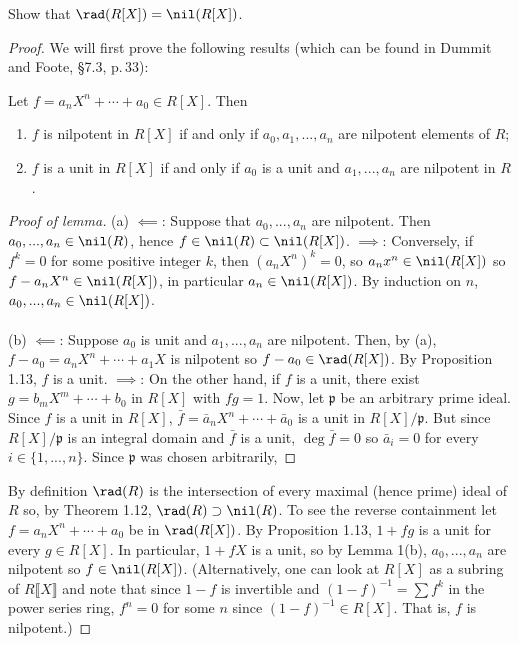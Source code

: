 \begin{problem}
Show that $\rad(R[X])=\nil(R[X])$.
\end{problem}
\begin{proof}
We will first prove the following results (which can be found in
Dummit and Foote, \S7.3, p.\,33):
\begin{lemma}
Let $f=a_nX^n+\cdots+a_0\in R[X]$. Then
\begin{enumerate}[noitemsep,label=(\alph*)]
\item $f$ is nilpotent in $R[X]$ if and only if $a_0,a_1,...,a_n$
  are nilpotent elements of $R$;
\item $f$ is a unit in $R[X]$ if and only if $a_0$ is a unit and
  $a_1,...,a_n$ are nilpotent in $R$.
\end{enumerate}
\end{lemma}
\begin{proof}[Proof of lemma]
\renewcommand\qedsymbol{$\vardiamondsuit$}
(a) $\impliedby$: Suppose that $a_0,...,a_n$ are nilpotent. Then
$a_0,...,a_n\in\nil(R)$, hence
$f\in\nil(R)\subset\nil(R[X])$. $\implies$: Conversely, if
$f^k=0$ for some positive integer $k$, then $(a_nX^n)^k=0$, so
$a_nx^n\in\nil(R[X])$ so $f-a_nX^n\in\nil(R[X])$, in particular
$a_n\in\nil(R[X])$. By induction on $n$,
$a_0,...,a_n\in\nil(R[X])$.
\\\\
(b) $\impliedby$: Suppose $a_0$ is unit and $a_1,...,a_n$ are
nilpotent. Then, by (a), $f-a_0=a_nX^n+\cdots+a_1X$ is nilpotent
so $f-a_0\in\rad(R[X])$. By Proposition 1.13, $f$ is a
unit. $\implies$: On the other hand, if $f$ is a unit, there
exist $g=b_mX^m+\cdots+b_0$ in $R[X]$ with $fg=1$. Now, let
$\mathfrak{p}$ be an arbitrary prime ideal. Since $f$ is a unit
in $R[X]$, $\bar f=\bar a_nX^n+\cdots+\bar a_0$ is a unit in
$R[X]/\mathfrak{p}$. But since $R[X]/\mathfrak{p}$ is an integral
domain and $\bar f$ is a unit, $\deg\bar f=0$ so $\bar a_i=0$ for
every $i\in\{1,...,n\}$. Since $\mathfrak{p}$ was chosen
arbitrarily,
\end{proof}
By definition $\rad(R)$ is the intersection of every maximal
(hence prime) ideal of $R$ so, by Theorem 1.12,
$\rad(R)\supset\nil(R)$. To see the reverse containment let
$f=a_nX^n+\cdots+a_0$ be in $\rad(R[X])$. By Proposition 1.13,
$1+fg$ is a unit for every $g\in R[X]$. In particular, $1+fX$ is
a unit, so by Lemma 1(b), $a_0,...,a_n$ are nilpotent so
$f\in\nil(R[X])$. (Alternatively, one can look at $R[X]$ as a
subring of $R\lBrack X\rBrack$ and note that since $1-f$ is
invertible and $(1-f)^{-1}=\sum f^k$ in the power series ring,
$f^n=0$ for some $n$ since $(1-f)^{-1}\in R[X]$. That is, $f$ is
nilpotent.)
\end{proof}
